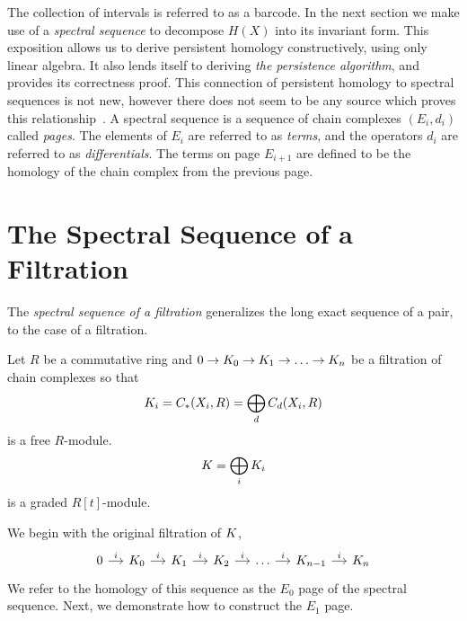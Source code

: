 The collection of intervals is referred to as a barcode. In the next section we make use of a \emph{spectral sequence} to decompose $H(X)$ into its invariant form. This exposition allows us to derive persistent homology constructively, using only linear algebra. It also lends itself to deriving \emph{the persistence algorithm}, and provides its correctness proof. This connection of persistent homology to spectral sequences is not new, however there does not seem to be any source which proves this relationship~\cite{zc-cph-04,edelsbrunner2010computational}. A spectral sequence is a sequence of chain complexes $(E_i, d_i)$ called \emph{pages}. The elements of $E_i$ are referred to as \emph{terms}, and the operators $d_i$ are referred to as \emph{differentials}. The terms on page $E_{i+1}$ are defined to be the homology of the chain complex from the previous page.

\section{The Spectral Sequence of a Filtration}
\label{sec:ss-filt}
The \emph{spectral sequence of a filtration} generalizes the long exact sequence of a pair, to the case of a filtration.

Let $R$ be a commutative ring and $0 \rightarrow K_0 \rightarrow K_1 \rightarrow  \ldots \rightarrow  K_n$ 
be a filtration of chain complexes so that \[ K_i = C_*(X_i, R) = \bigoplus_d C_d(X_i, R)\] is a free $R$-module.
\[ K = \bigoplus_i K_i \] is a graded $R[t]$-module.

\noindent We begin with the original filtration of $K$,
\[
\begin{tikzcd} [column sep=small]
0 \arrow{r}{i} & \K_0 \arrow{r}{i} & \K_1 \arrow{r}{i}   & \K_2 \arrow{r}{i} & \ldots \arrow{r}{i} & \K_{n-1} \arrow{r}{i} & \K_n
\end{tikzcd}
\]
We refer to the homology of this sequence as the $E_0$ page of the spectral sequence. Next, we demonstrate how to construct the $E_1$ page.

